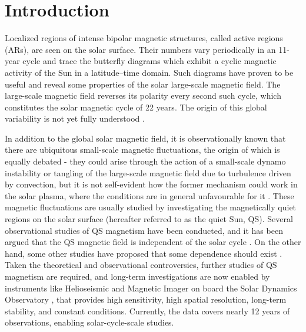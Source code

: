 \documentclass{aa}
\begin{document}

\maketitle

\section{Introduction} \label{sec:intro}

Localized regions of intense bipolar magnetic structures, called active regions
(ARs), are seen on the solar surface. Their numbers vary periodically 
in an 11-year cycle
and trace the
butterfly diagrams which exhibit a cyclic magnetic activity of the Sun in a latitude--time
domain. Such diagrams have proven to be useful and reveal some properties of 
the solar large-scale magnetic field. The large-scale magnetic field reverses its polarity every
second such cycle, which constitutes the solar magnetic cycle of 22 years. The origin of this
global variability is not yet fully understood \citep[see, e.g.,][]{char10}.

In addition to the global solar magnetic field, it is observationally known that there are ubiquitous small-scale magnetic fluctuations, the origin of which is equally debated - they could arise through the action of a small-scale dynamo instability or tangling of the large-scale magnetic field due to turbulence driven by convection, but it is not self-evident how the former mechanism could work in the solar plasma, where the conditions are in general unfavourable for it \citep[see, e.g.][]{BS05}. These magnetic fluctuations are usually studied by investigating the magnetically quiet regions on the solar surface (hereafter referred to as the quiet Sun, QS). Several observational
studies of QS magnetism have been conducted, and it has been argued
that the QS magnetic field is 
independent of the solar cycle 
\cite[]{Kleint+10,Buehler+13,Faurobert+15,Jin+15a,Jin+15b}. On the other hand, some other studies have proposed
that some dependence should exist \cite[]{Lites+14,Faurobert+21}. 
Taken the theoretical and observational controversies, further studies of QS magnetism are required, and long-term investigations are now enabled by instruments like
Helioseismic and Magnetic Imager \cite[HMI,][]{2012SoPh..275..207S,2012SoPh..275..229S} on board the Solar Dynamics Observatory \cite[SDO,][]{2012SoPh..275....3P}, that provides high sensitivity, high spatial
resolution, long-term stability, and constant conditions. Currently, the data covers nearly 12 years of observations, enabling solar-cycle-scale studies.
\end{document}
